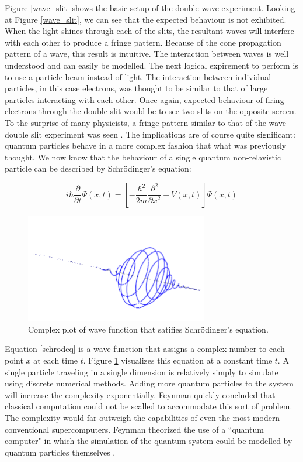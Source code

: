 \documentclass[conference]{IEEEtran}
\begin{document}
Figure \ref{wave_slit} shows the basic setup of the double wave experiment. Looking at Figure \ref{wave_slit}, we can see that the expected behaviour is not exhibited. When the light shines through each of the slits, the resultant waves will interfere with each other to produce a fringe pattern. Because of the cone propagation pattern of a wave, this result is intuitive. The interaction between waves is well understood and can easily be modelled. The next logical expirement to perform is to use a particle beam instead of light. The interaction between individual particles, in this case electrons, was thought to be similar to that of large particles interacting with each other. Once again, expected behaviour of firing electrons through the double slit would be to see two slits on the opposite screen. To the surprise of many physicists, a fringe pattern similar to that of the wave double slit experiment was seen \cite{b4}. The implications are of course quite significant: quantum particles behave in a more complex fashion that what was previously thought. We now know that the behaviour of a single quantum non-relavistic particle can be described by Schr\"{o}dinger's equation:

\begin{equation}
i\hbar {\frac {\partial }{\partial t}}\Psi (x,t)=\left[-{\frac {\hbar ^{2}}{2m}}{\frac {\partial ^{2}}{\partial x^{2}}}+V(x,t)\right]\Psi (x,t)
\label{schrodeq}
\end{equation}

\begin{figure}[htbp]
\centerline{\includegraphics[width=8cm]{schrodinger}}
\caption{Complex plot of wave function that satifies Schr\"{o}dinger's equation.}
\label{schrod}
\end{figure}

Equation \ref{schrodeq} is a wave function that assigns a complex number to each point $x$ at each time $t$. Figure \ref{schrod} visualizes this equation at a constant time $t$. A single particle traveling in a single dimension is relatively simply to simulate using discrete numerical methods. Adding more quantum particles to the system will increase the complexity exponentially. Feynman quickly concluded that classical computation could not be scalled to accommodate this sort of problem. The complexity would far outweigh the capabilities of even the most modern conventional supercomputers. Feynman theorized the use of a ``quantum computer" in which the simulation of the quantum system could be modelled by quantum particles themselves \cite{b4}.
\end{document}
